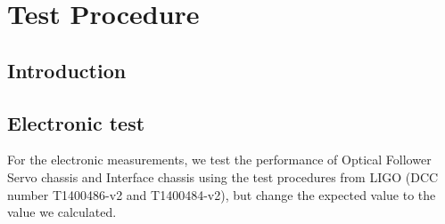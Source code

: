
\chapter{Test Procedure} %

\label{Chapter1} %


\section{Introduction}
\section{Electronic test}
For the electronic measurements, we test the performance of Optical Follower Servo chassis and Interface chassis using the test procedures from LIGO (DCC number T1400486-v2 and T1400484-v2), but change the expected value to the value we calculated.
